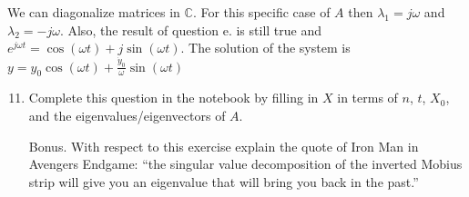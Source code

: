 We can diagonalize matrices in $\mathbb{C}$. For this specific case of $A$ then $\lambda_1 = j\omega$ and $\lambda_2 = -j\omega$. Also, the result of question e. is still true and $e^{j\omega t} = \cos(\omega t) + j \sin(\omega t)$. The solution of the system is $y = y_0 \cos(\omega t) + \frac{\dot{y}_0}{\omega} \sin(\omega t)$

\begin{enumerate}
\setcounter{enumi}{10}
\item Complete this question in the notebook by filling in $X$ in terms of $n$, $t$, $X_0$, and the eigenvalues/eigenvectors of $A$.

\sol{}

\item[Bonus.] With respect to this exercise explain the quote of Iron Man in Avengers Endgame: ``the singular value decomposition of the inverted Mobius strip will give you an eigenvalue that will bring you back in the past.''

\sol{}
\end{enumerate}